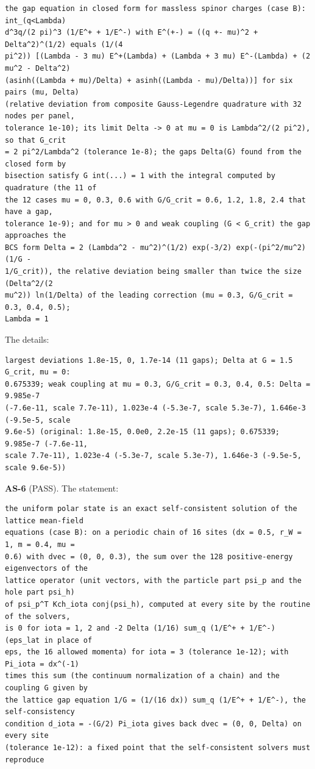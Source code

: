 \documentclass[
  10pt,
]{article}
\begin{document}
\begin{verbatim}
the gap equation in closed form for massless spinor charges (case B): int_(q<Lambda)
d^3q/(2 pi)^3 (1/E^+ + 1/E^-) with E^(+-) = ((q +- mu)^2 + Delta^2)^(1/2) equals (1/(4
pi^2)) [(Lambda - 3 mu) E^+(Lambda) + (Lambda + 3 mu) E^-(Lambda) + (2 mu^2 - Delta^2)
(asinh((Lambda + mu)/Delta) + asinh((Lambda - mu)/Delta))] for six pairs (mu, Delta)
(relative deviation from composite Gauss-Legendre quadrature with 32 nodes per panel,
tolerance 1e-10); its limit Delta -> 0 at mu = 0 is Lambda^2/(2 pi^2), so that G_crit
= 2 pi^2/Lambda^2 (tolerance 1e-8); the gaps Delta(G) found from the closed form by
bisection satisfy G int(...) = 1 with the integral computed by quadrature (the 11 of
the 12 cases mu = 0, 0.3, 0.6 with G/G_crit = 0.6, 1.2, 1.8, 2.4 that have a gap,
tolerance 1e-9); and for mu > 0 and weak coupling (G < G_crit) the gap approaches the
BCS form Delta = 2 (Lambda^2 - mu^2)^(1/2) exp(-3/2) exp(-(pi^2/mu^2) (1/G -
1/G_crit)), the relative deviation being smaller than twice the size (Delta^2/(2
mu^2)) ln(1/Delta) of the leading correction (mu = 0.3, G/G_crit = 0.3, 0.4, 0.5);
Lambda = 1
\end{verbatim}

The details:

\begin{verbatim}
largest deviations 1.8e-15, 0, 1.7e-14 (11 gaps); Delta at G = 1.5 G_crit, mu = 0:
0.675339; weak coupling at mu = 0.3, G/G_crit = 0.3, 0.4, 0.5: Delta = 9.985e-7
(-7.6e-11, scale 7.7e-11), 1.023e-4 (-5.3e-7, scale 5.3e-7), 1.646e-3 (-9.5e-5, scale
9.6e-5) (original: 1.8e-15, 0.0e0, 2.2e-15 (11 gaps); 0.675339; 9.985e-7 (-7.6e-11,
scale 7.7e-11), 1.023e-4 (-5.3e-7, scale 5.3e-7), 1.646e-3 (-9.5e-5, scale 9.6e-5))
\end{verbatim}

\textbf{AS-6} (PASS). The statement:

\begin{verbatim}
the uniform polar state is an exact self-consistent solution of the lattice mean-field
equations (case B): on a periodic chain of 16 sites (dx = 0.5, r_W = 1, m = 0.4, mu =
0.6) with dvec = (0, 0, 0.3), the sum over the 128 positive-energy eigenvectors of the
lattice operator (unit vectors, with the particle part psi_p and the hole part psi_h)
of psi_p^T Kch_iota conj(psi_h), computed at every site by the routine of the solvers,
is 0 for iota = 1, 2 and -2 Delta (1/16) sum_q (1/E^+ + 1/E^-) (eps_lat in place of
eps, the 16 allowed momenta) for iota = 3 (tolerance 1e-12); with Pi_iota = dx^(-1)
times this sum (the continuum normalization of a chain) and the coupling G given by
the lattice gap equation 1/G = (1/(16 dx)) sum_q (1/E^+ + 1/E^-), the self-consistency
condition d_iota = -(G/2) Pi_iota gives back dvec = (0, 0, Delta) on every site
(tolerance 1e-12): a fixed point that the self-consistent solvers must reproduce
\end{verbatim}
\end{document}
